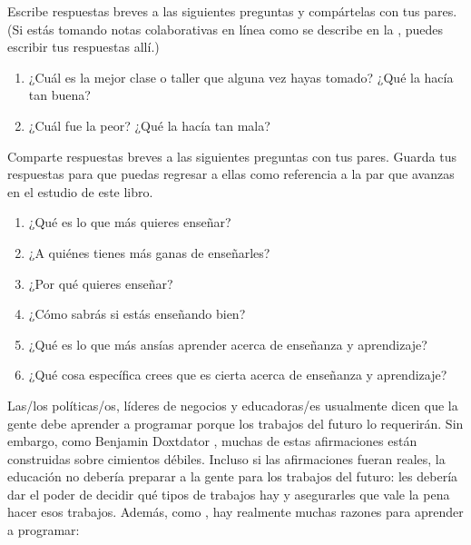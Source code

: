 
Escribe respuestas breves a las siguientes preguntas y compártelas con tus pares.
(Si estás tomando notas colaborativas en línea como se describe en la , puedes escribir tus respuestas allí.)

\begin{enumerate}

\item
 ¿Cuál es la mejor clase o taller que alguna vez hayas tomado?
 ¿Qué la hacía tan buena?

\item
 ¿Cuál fue la peor? 
 ¿Qué la hacía tan mala?

\end{enumerate}


Comparte respuestas breves a las siguientes preguntas con tus pares.
Guarda tus respuestas para que puedas regresar a ellas como referencia
a la par que avanzas en el estudio de este libro. 

\begin{enumerate}

\item
 ¿Qué es lo que más quieres enseñar?

\item
 ¿A quiénes tienes más ganas de enseñarles?

\item
 ¿Por qué quieres enseñar?

\item
 ¿Cómo sabrás si estás enseñando bien?

\item
 ¿Qué es lo que más ansías aprender acerca de enseñanza y aprendizaje? 

\item
 ¿Qué cosa específica crees que es cierta acerca de enseñanza y aprendizaje?

\end{enumerate}


Las/los políticas/os, líderes de negocios y educadoras/es usualmente dicen que
la gente debe aprender a programar porque los trabajos del futuro lo requerirán.
Sin embargo,
como Benjamin Doxtdator
,
muchas de estas afirmaciones están construidas sobre cimientos débiles.
Incluso si las afirmaciones fueran reales, la educación no debería preparar a la gente para los trabajos del futuro:
les debería dar el poder de decidir qué tipos de trabajos hay y asegurarles que vale la pena hacer esos trabajos.
Además, como ,
hay realmente muchas razones para aprender a programar:

